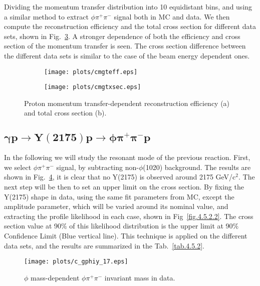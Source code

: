 Dividing the momentum transfer distribution into 10 equidistant bins, and using a similar method to extract $\phi \pi^+ \pi^-$ signal both in MC and data. We then compute the reconstruction efficiency and the total cross section for different data sets, shown in Fig.~\ref{fig.4.5.1.6}. A stronger dependence of both the efficiency and cross section of the momentum transfer is seen. The cross section difference between the different data sets is similar to the case of the beam energy dependent ones. 

\begin{figure}[H]
    \centering
    \begin{subfigure}[b]{0.45\textwidth}
        \texttt{[image: plots/cmgteff.eps]}
        \caption{}
        \label{fig.4.5.1.6.a}
    \end{subfigure}
    \begin{subfigure}[b]{0.45\textwidth}
        \texttt{[image: plots/cmgtxsec.eps]}
        \caption{}
        \label{fig.4.5.1.6.b}
    \end{subfigure}
    \caption{Proton momentum transfer-dependent reconstruction efficiency (a) and total cross section (b).}
    \label{fig.4.5.1.6}
\end{figure}

\subsection{\texorpdfstring{$\bm{\gamma p \rightarrow Y(2175) p \rightarrow \phi \pi^{+} \pi^{-} p}$}{}}
\label{p.4.5.2}

In the following we will study the resonant mode of the previous reaction. First, we select $\phi \pi^+ \pi^-$ signal, by subtracting non-$\phi$(1020) background. The results are shown in Fig.~\ref{fig.4.5.2.1}, it is clear that no Y(2175) is observed around 2175 GeV/c$^2$. The next step will be then to set an upper limit on the cross section. By fixing the Y(2175) shape in data, using the same fit parameters from MC, except the amplitude parameter, which will be varied around its nominal value, and extracting the profile likelihood in each case, shown in Fig~\ref{fig.4.5.2.2}. The cross section value at 90$\%$ of this likelihood distribution is the upper limit at 90$\%$ Confidence Limit (Blue vertical line). This technique is applied on the different data sets, and the results are summarized in the Tab.~\ref{tab.4.5.2}.

\begin{figure}[H]
    \centering
    \texttt{[image: plots/c\_gphiy\_17.eps]}
    \caption{\label{fig.4.5.2.1}$\phi$ mass-dependent $\phi \pi^+ \pi^-$ invariant mass in data.}
\end{figure}

